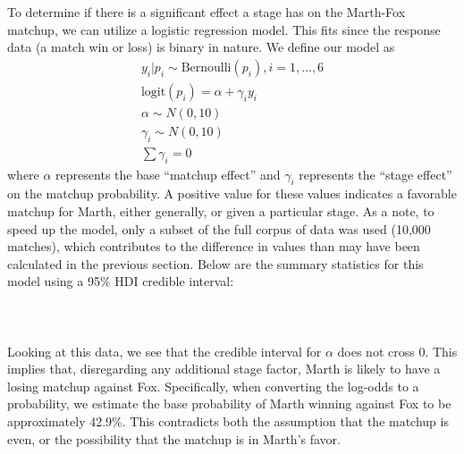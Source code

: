 \indent To determine if there is a significant effect a stage has on the Marth-Fox matchup, we can utilize a logistic regression model. This fits since the response data (a match win or loss) is binary in nature. We define our model as
\begin{align*}
    y_i|p_i\sim\text{Bernoulli}(p_i), i=1,\dots,6\\
    \text{logit}(p_i) = \alpha+\gamma_iy_i\\
    \alpha\sim N(0, 10)\\
    \gamma_i\sim N(0, 10)\\
    \sum\gamma_i = 0
\end{align*}
where $\alpha$ represents the base ``matchup effect'' and $\gamma_i$ represents the ``stage effect'' on the matchup probability. A positive value for these values indicates a favorable matchup for Marth, either generally, or given a particular stage. As a note, to speed up the model, only a subset of the full corpus of data was used (10,000 matches), which contributes to the difference in values than may have been calculated in the previous section. Below are the summary statistics for this model using a 95\% HDI credible interval:
\\\\
\\\\
Looking at this data, we see that the credible interval for $\alpha$ does not cross 0. This implies that, disregarding any additional stage factor, Marth is likely to have a losing matchup against Fox. Specifically, when converting the log-odds to a probability, we estimate the base probability of Marth winning against Fox to be approximately 42.9\%. This contradicts both the assumption that the matchup is even, or the possibility that the matchup is in Marth's favor.

